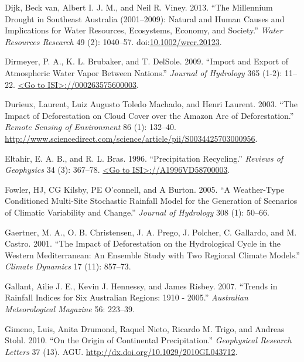 \documentclass[]{elsarticle} %
\theoremstyle{definition}
\theoremstyle{definition}
\theoremstyle{definition}
\theoremstyle{remark}
\begin{document}
\hypertarget{ref-vanDijk2013}{}
Dijk, Beck van, Albert I. J. M., and Neil R. Viney. 2013. ``The
Millennium Drought in Southeast Australia (2001--2009): Natural and
Human Causes and Implications for Water Resources, Ecosystems, Economy,
and Society.'' \emph{Water Resources Research} 49 (2): 1040--57.
doi:\href{https://doi.org/10.1002/wrcr.20123}{10.1002/wrcr.20123}.

\hypertarget{ref-Dirmeyer2009}{}
Dirmeyer, P. A., K. L. Brubaker, and T. DelSole. 2009. ``Import and
Export of Atmospheric Water Vapor Between Nations.'' \emph{Journal of
Hydrology} 365 (1-2): 11--22.
\href{\%3CGo\%20to\%20ISI\%3E://000263575600003}{\textless{}Go to ISI\textgreater{}://000263575600003}.

\hypertarget{ref-Durieux2003}{}
Durieux, Laurent, Luiz Augusto Toledo Machado, and Henri Laurent. 2003.
``The Impact of Deforestation on Cloud Cover over the Amazon Arc of
Deforestation.'' \emph{Remote Sensing of Environment} 86 (1): 132--40.
\url{http://www.sciencedirect.com/science/article/pii/S0034425703000956}.

\hypertarget{ref-Eltahir1996}{}
Eltahir, E. A. B., and R. L. Bras. 1996. ``Precipitation Recycling.''
\emph{Reviews of Geophysics} 34 (3): 367--78.
\href{\%3CGo\%20to\%20ISI\%3E://A1996VD58700003}{\textless{}Go to ISI\textgreater{}://A1996VD58700003}.

\hypertarget{ref-Fowler2005}{}
Fowler, HJ, CG Kilsby, PE O'connell, and A Burton. 2005. ``A
Weather-Type Conditioned Multi-Site Stochastic Rainfall Model for the
Generation of Scenarios of Climatic Variability and Change.''
\emph{Journal of Hydrology} 308 (1): 50--66.

\hypertarget{ref-Gaertner2001}{}
Gaertner, M. A., O. B. Christensen, J. A. Prego, J. Polcher, C.
Gallardo, and M. Castro. 2001. ``The Impact of Deforestation on the
Hydrological Cycle in the Western Mediterranean: An Ensemble Study with
Two Regional Climate Models.'' \emph{Climate Dynamics} 17 (11): 857--73.

\hypertarget{ref-Gallant2007}{}
Gallant, Ailie J. E., Kevin J. Hennessy, and James Risbey. 2007.
``Trends in Rainfall Indices for Six Australian Regions: 1910 - 2005.''
\emph{Australian Meteorological Magazine} 56: 223--39.

\hypertarget{ref-Gimeno2010}{}
Gimeno, Luis, Anita Drumond, Raquel Nieto, Ricardo M. Trigo, and Andreas
Stohl. 2010. ``On the Origin of Continental Precipitation.''
\emph{Geophysical Research Letters} 37 (13). AGU.
\url{http://dx.doi.org/10.1029/2010GL043712}.
\end{document}
